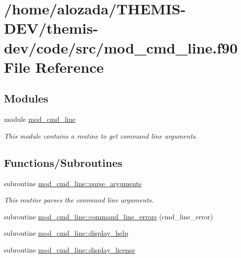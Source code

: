 \hypertarget{mod__cmd__line_8f90}{}\section{/home/alozada/\+T\+H\+E\+M\+I\+S-\/\+D\+E\+V/themis-\/dev/code/src/mod\+\_\+cmd\+\_\+line.f90 File Reference}
\label{mod__cmd__line_8f90}
\subsection*{Modules}
\begin{DoxyCompactItemize}
\item 
module \hyperlink{namespacemod__cmd__line}{mod\+\_\+cmd\+\_\+line}
\begin{DoxyCompactList}\small\item\em This module contains a routine to get command line arguments. \end{DoxyCompactList}\end{DoxyCompactItemize}
\subsection*{Functions/\+Subroutines}
\begin{DoxyCompactItemize}
\item 
subroutine \hyperlink{namespacemod__cmd__line_af3e6d85ae8e1f68f4c7c22e40bd3f3bb}{mod\+\_\+cmd\+\_\+line\+::parse\+\_\+arguments}
\begin{DoxyCompactList}\small\item\em This routine parses the command line arguments. \end{DoxyCompactList}\item 
subroutine \hyperlink{namespacemod__cmd__line_ad2ecb585bbedcf49bd8219c82d034147}{mod\+\_\+cmd\+\_\+line\+::command\+\_\+line\+\_\+errors} (cmd\+\_\+line\+\_\+error)
\item 
subroutine \hyperlink{namespacemod__cmd__line_add2ef454c82fd88ce99ea2fa978b2e6f}{mod\+\_\+cmd\+\_\+line\+::display\+\_\+help}
\item 
subroutine \hyperlink{namespacemod__cmd__line_a5836de50b766a84c4d341efc9a9bcee0}{mod\+\_\+cmd\+\_\+line\+::display\+\_\+license}
\end{DoxyCompactItemize}
